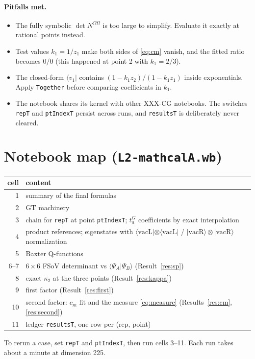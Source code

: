 \documentclass[11pt]{article}
\newcommand{\vacL}{\langle\mathrm{vacL}|}
\newcommand{\vacR}{|\mathrm{vacR}\rangle}
\newcommand{\nb}[1]{\texttt{#1}}
\theoremstyle{definition}
\theoremstyle{remark}
\begin{document}
\paragraph{Pitfalls met.}
\begin{itemize}
\item The fully symbolic $\det N^{\Omega\Omega}$ is too large to simplify. Evaluate it exactly at rational points instead.
\item Test values $k_1=1/z_1$ make both sides of \eqref{eq:cm} vanish, and the fitted ratio becomes $0/0$ (this happened at point 2 with $k_1=2/3$).
\item The closed-form $\langle v_1|$ contains $(1-k_1z_2)/(1-k_1z_1)$ inside exponentials. Apply \nb{Together} before comparing coefficients in $k_1$.
\item The notebook shares its kernel with other XXX-CG notebooks. The switches \nb{repT} and \nb{ptIndexT} persist across runs, and \nb{resultsT} is deliberately never cleared.
\end{itemize}

\section*{Notebook map (\nb{L2-mathcalA.wb})}
\begin{center}
\begin{tabular}{rl}\toprule
cell & content\\\midrule
1 & summary of the final formulas\\
2 & GT machinery\\
3 & chain for \nb{repT} at point \nb{ptIndexT}; $t^G_a$ coefficients by exact interpolation\\
4 & product references; eigenstates with $\vacL\otimes\vacL$ / $\vacR\otimes\vacR$ normalization\\
5 & Baxter Q-functions\\
6--7 & $6\times6$ FSoV determinant vs $\langle\Psi_A|\Psi_B\rangle$ (Result~\ref{res:sp})\\
8 & exact $\kappa_2$ at the three points (Result~\ref{res:kappa})\\
9 & first factor (Result~\ref{res:first})\\
10 & second factor: $c_m$ fit and the measure \eqref{eq:measure} (Results~\ref{res:cm}, \ref{res:second})\\
11 & ledger \nb{resultsT}, one row per (rep, point)\\\bottomrule
\end{tabular}
\end{center}
To rerun a case, set \nb{repT} and \nb{ptIndexT}, then run cells 3--11. Each run takes about a minute at dimension 225.
\end{document}

